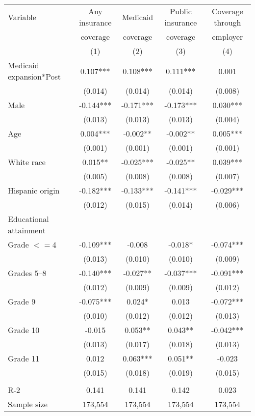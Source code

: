 \begin{tabular}{lcccc}
\toprule
\toprule
 Variable & Any insurance & Medicaid & Public insurance & Coverage through \\
  & coverage & coverage & coverage &  employer \\
  & (1) & (2) & (3) &  (4) \\
\midrule 
 Medicaid expansion*Post   & 0.107***   & 0.108***   & 0.111***   & 0.001  \\
 & (0.014)   & (0.014)   & (0.014)   & (0.008)  \\
 Male   & -0.144***   & -0.171***   & -0.173***   & 0.030***  \\
 & (0.013)   & (0.013)   & (0.013)   & (0.004)  \\
 Age   & 0.004***   & -0.002**   & -0.002**   & 0.005***  \\
 & (0.001)   & (0.001)   & (0.001)   & (0.001)  \\
 White race   & 0.015**   & -0.025***   & -0.025**   & 0.039***  \\
 & (0.005)   & (0.008)   & (0.008)   & (0.007)  \\
 Hispanic origin   & -0.182***   & -0.133***   & -0.141***   & -0.029***  \\
 & (0.012)   & (0.015)   & (0.014)   & (0.006)  \\
 Educational attainment  \\
 \hspace{0.3cm} Grade $<=$4   & -0.109***   & -0.008   & -0.018*   & -0.074***  \\
 & (0.013)   & (0.010)   & (0.010)   & (0.009)  \\
 \hspace{0.3cm}  Grades 5--8   & -0.140***   & -0.027**   & -0.037***   & -0.091***  \\
 & (0.012)   & (0.009)   & (0.009)   & (0.012)  \\
 \hspace{0.3cm} Grade 9   & -0.075***   & 0.024*   & 0.013   & -0.072***  \\
 & (0.010)   & (0.012)   & (0.012)   & (0.013)  \\
 \hspace{0.3cm} Grade 10   & -0.015   & 0.053**   & 0.043**   & -0.042***  \\
 & (0.013)   & (0.017)   & (0.018)   & (0.013)  \\
 \hspace{0.3cm} Grade 11   & 0.012   & 0.063***   & 0.051**   & -0.023  \\
 & (0.015)   & (0.018)   & (0.019)   & (0.015)  \\
\\
R-2 & 0.141 & 0.141 & 0.142 & 0.023 \\
Sample size & 173,554 & 173,554 & 173,554 & 173,554 \\
\bottomrule
\bottomrule
\end{tabular}